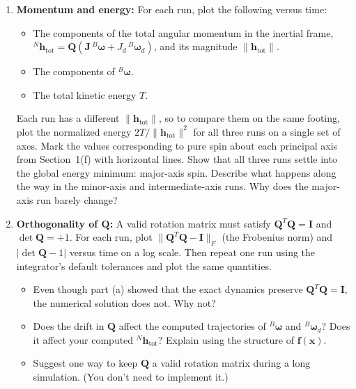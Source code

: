 \documentclass[11pt,letterpaper]{article}
\newcommand{\bh}{\mathbf{h}}
\newcommand{\Bw}{{}^{B}\boldsymbol{\omega}}
\newcommand{\Bwd}{{}^{B}\boldsymbol{\omega}_d}
\newcommand{\Nht}{{}^{N}\mathbf{h}_{\text{tot}}}
\newcommand{\bJ}{\mathbf{J}}
\newcommand{\bQ}{\mathbf{Q}}
\newcommand{\bx}{\mathbf{x}}
\begin{document}
\begin{enumerate}[label=(\alph*)]
    \item \textbf{Momentum and energy:} For each run, plot the following versus time:
    \begin{itemize}
        \item The components of the total angular momentum in the inertial frame, $\Nht = \bQ\left(\bJ\,\Bw + J_d\,\Bwd\right)$, and its magnitude $\lVert\bh_{\text{tot}}\rVert$.
        \item The components of $\Bw$.
        \item The total kinetic energy $T$.
    \end{itemize}
    Each run has a different $\lVert\bh_{\text{tot}}\rVert$, so to compare them on the same footing, plot the normalized energy $2T/\lVert\bh_{\text{tot}}\rVert^2$ for all three runs on a single set of axes. Mark the values corresponding to pure spin about each principal axis from Section~1(f) with horizontal lines. Show that all three runs settle into the global energy minimum: major-axis spin. Describe what happens along the way in the minor-axis and intermediate-axis runs. Why does the major-axis run barely change?

    \item \textbf{Orthogonality of $\bQ$:} A valid rotation matrix must satisfy $\bQ^T\bQ = \mathbf{I}$ and $\det\bQ = +1$. For each run, plot $\lVert\bQ^T\bQ - \mathbf{I}\rVert_F$ (the Frobenius norm) and $\lvert\det\bQ - 1\rvert$ versus time on a log scale. Then repeat one run using the integrator's default tolerances and plot the same quantities.
    \begin{itemize}
        \item Even though part (a) showed that the exact dynamics preserve $\bQ^T\bQ = \mathbf{I}$, the numerical solution does not. Why not?
        \item Does the drift in $\bQ$ affect the computed trajectories of $\Bw$ and $\Bwd$? Does it affect your computed $\Nht$? Explain using the structure of $\mathbf{f}(\bx)$.
        \item Suggest one way to keep $\bQ$ a valid rotation matrix during a long simulation. (You don't need to implement it.)
    \end{itemize}
\end{enumerate}
\end{document}
